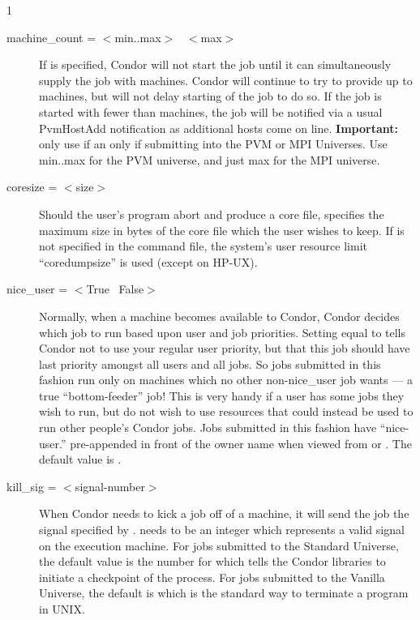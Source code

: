 \begin{ManPage}{\label{man-condor-submit}}{1}
\begin{description}

\item[machine\_count = $<$min..max$>$ \Bar\ $<$max$>$] 
If  is
specified, Condor will not start the job until it can simultaneously
supply the job with  machines.  Condor will continue to try 
to provide up
to  machines, but will not delay starting of the job to do so.
If the job is started with fewer than  machines, the job
will be notified via a usual PvmHostAdd notification as additional
hosts come on line.
\textbf{Important:} only use  if an only if
submitting into the PVM or MPI Universes.  Use min..max for the PVM
universe, and just max for the MPI universe.


\item[coresize = $<$size$>$] Should the user's program abort and produce
a core file,  specifies the maximum size in bytes of the
core file which the user wishes to keep. If  is not
specified in the command file, the system's user resource limit
\mbox{``coredumpsize''} is used (except on HP-UX). 


\item[nice\_user = $<$True \Bar\ False$>$] \label{man-condor-submit-nice}Normally, when a machine
becomes available to Condor, Condor decides which job to run based upon
user and job priorities. Setting  equal to 
tells Condor not to use your regular user priority, but that this job
should have last priority amongst all users and all jobs. So jobs
submitted in this fashion run only on machines which no other
non-nice\_user job wants --- a true ``bottom-feeder'' job! This is very
handy if a user has some jobs they wish to run, but do not wish to use
resources that could instead be used to run other people's Condor jobs. Jobs
submitted in this fashion have ``nice-user.'' pre-appended in front of
the owner name when viewed from  or .  The
default value is .


\item[kill\_sig = $<$signal-number$>$] When Condor needs to kick a job
off of a machine, it will send the job the signal specified by
.   needs to be an integer which
represents a valid signal on the execution machine.  For jobs submitted
to the Standard Universe, the default value is the number for
\verb@SIGTSTP@ which tells the Condor libraries to initiate a checkpoint
of the process.  For jobs submitted to the Vanilla Universe, the default 
is \verb@SIGTERM@ which is the standard way to terminate a program in UNIX.  


\end{description}
\end{ManPage}
